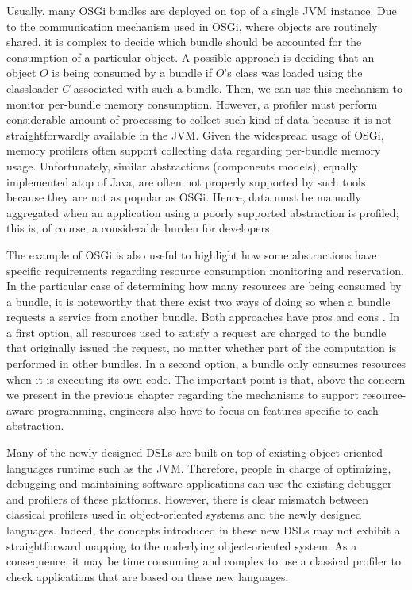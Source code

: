 Usually, many OSGi bundles are deployed on top of a single JVM instance.
Due to the communication mechanism used in OSGi, where objects are routinely shared, it is complex to decide which bundle should be accounted for the consumption of a particular object.
A possible approach is deciding that an object $O$ is being consumed by a bundle if $O$'s class was loaded using the classloader $C$ associated with such a bundle.
Then, we can use this mechanism to monitor per-bundle memory consumption. 
However, a profiler must perform considerable amount of processing to collect such kind of data because it is not straightforwardly available in the JVM. 
Given the widespread usage of OSGi, memory profilers often support collecting data regarding per-bundle memory usage.
Unfortunately, similar abstractions (components models), equally implemented atop of Java, are often not properly supported by such tools because they are not as popular as OSGi.
Hence, data must be manually aggregated when an application using a poorly supported abstraction is profiled; this is, of course, a considerable burden for developers.

The example of OSGi is also useful to highlight how some abstractions have specific requirements regarding resource consumption monitoring and reservation.
In the particular case of determining how many resources are being consumed by a bundle, it is noteworthy that there exist two ways of doing so when a bundle requests a service from another bundle.
Both approaches have pros and cons \cite{lo citado por kouther, y kouther}.
In a first option, all resources used to satisfy a request are charged to the bundle that originally issued the request, no matter whether part of the computation is performed in other bundles.
In a second option, a bundle only consumes resources when it is executing its own code.
The important point is that, above the concern we present in the previous chapter regarding the mechanisms to support resource-aware programming, engineers also have to focus on features specific to each abstraction.

Many of the newly designed DSLs are built on top of existing object-oriented languages runtime such as the JVM. 
Therefore, people in charge of optimizing, debugging and maintaining software applications can use the existing debugger and profilers of these platforms. 
However, there is clear mismatch between classical profilers used in object-oriented systems and the newly designed languages. 
Indeed, the concepts introduced in these new DSLs may not exhibit a straightforward mapping to the underlying object-oriented system.
As a consequence, it may be time consuming and complex to use a classical profiler to check applications that are based on these new languages.


